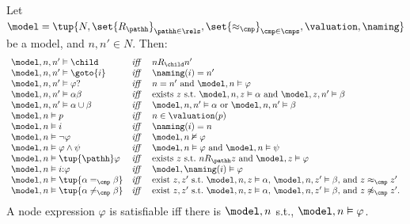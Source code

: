 \begin{defi}\label{def:semantics}
  Let $\model = \tup{N, \set{R_\pathh}_{\pathh \in \rels}, \set{\approx_{\cmp}}_{\cmp\in\cmps}, \valuation, \naming}$ be a model, and $n,n'\in N$. Then: 
  \[
    \begin{array}{l@{\quad}l@{\quad}l}
      \model, n, n' \vDash \child
        & \text{\it iff} &   n R_{\child} n'   \\
      \model, n, n' \vDash \goto{i}
        & \text{\it iff } &  \naming(i) = n' \\ 
      \model, n, n' \vDash  \varphi?
        & \text{\it iff} & n=n' \text{ and } \model, n \vDash   \varphi  \\
      \model, n, n' \vDash \alpha\beta
        & \text{\it iff} & \text{exists } z \text{ s.t.\ } \model,  n, z \vDash \alpha \text{ and }  \model,  z, n' \vDash \beta \\
      \model, n, n' \vDash \alpha \cup \beta
        & \text{\it iff} & \model, n, n' \vDash  \alpha  \text{ or } \model, n, n' \vDash  \beta \\
      \model, n    \vDash p
        & \text{\it iff} &  n \in \valuation(p)\\
      \model, n    \vDash i
        & \text{\it iff} &  \naming(i) = n \\
      \model, n    \vDash \lnot \varphi
        & \text{\it iff} &   \model, n \nvDash  \varphi \\
      \model, n    \vDash \varphi \land \psi
        & \text{\it iff} &   \model, n \vDash  \varphi \text{ and }  \model, n \vDash  \psi  \\
      \model, n    \vDash  \tup{\pathh}\varphi
        & \text{\it iff} & \text{exists } z \text{ s.t.\ } nR_{\pathh}z \text{ and } \model, z \vDash \varphi \\
      \model, n   \vDash  i{:}\varphi
        & \text{\it iff } & \model, \naming(i) \vDash \varphi \\
      \model, n    \vDash \tup{\alpha =_\cmp \beta}
        & \text{\it iff} & \text{exist } z, z' \text{ s.t.\ } \model, n, z \vDash  \alpha \text{, } \model, n, z' \vDash  \beta \text{, and } z \approx_\cmp z' \\
      \model, n    \vDash \tup{\alpha \neq_\cmp \beta}
        & \text{\it iff} & \text{exist } z, z' \text{ s.t.\ } \model, n, z \vDash  \alpha \text{, } \model, n, z' \vDash  \beta \text{, and } z \not\approx_\cmp z'.
    \end{array}
  \]
  A node expression $\varphi$ is satisfiable iff there is $\model, n$ s.t., $\model, n \vDash \varphi$.

\end{defi}
